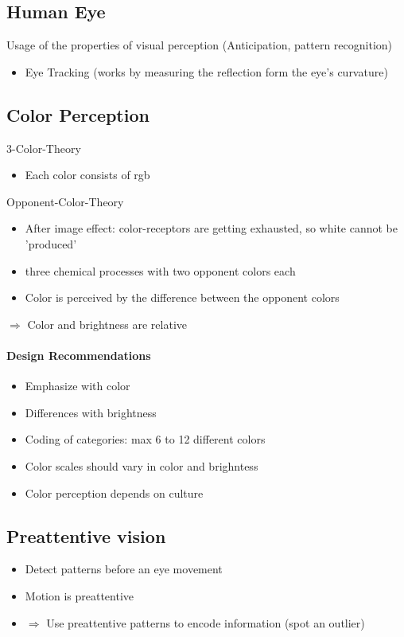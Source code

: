 \documentclass[ngerman]{scrartcl}
\begin{document}
\subsection*{Human Eye}
Usage of the properties of visual perception (Anticipation, pattern recognition)
\begin{itemize}
  \item Eye Tracking (works by measuring the reflection form the eye's curvature)
\end{itemize}

\subsection{Color Perception}
3-Color-Theory
\begin{itemize}
  \item Each color consists of rgb
\end{itemize}
Opponent-Color-Theory
\begin{itemize}
  \item After image effect: color-receptors are getting exhausted, so white cannot be 'produced'
  \item three chemical processes with two opponent colors each 
  \item Color is perceived by the difference between the opponent colors
\end{itemize}
$ \Rightarrow $ Color and brightness are relative

\paragraph*{Design Recommendations}
\begin{itemize}
  \item Emphasize with color
  \item Differences with brightness
  \item Coding of categories: max 6 to 12 different colors
  \item Color scales should vary in color and brighntess 
  \item Color perception depends on culture
\end{itemize}


\subsection{Preattentive vision}
\begin{itemize}
  \item Detect patterns before an eye movement
  \item Motion is preattentive
  \item $ \Rightarrow $ Use preattentive patterns to encode information (spot an outlier)
\end{itemize}
\end{document}
